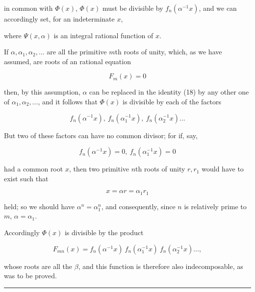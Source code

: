 in common with $\Phi(x)$, $\Phi(x)$ must be divisible by $f_n(\alpha^{-1}x)$, and we can accordingly set, for an indeterminate $x$,


where $\Psi(x,\alpha)$ is an integral rational function of $x$.

If $\alpha, \alpha_1, \alpha_2, \ldots$ are all the primitive $m$th roots of unity, which, as we have assumed, are roots of an  rational equation

\[
F_m(x) = 0
\]

then, by this assumption, $\alpha$ can be replaced in the identity (18) by any other one of $\alpha_1, \alpha_2, \ldots$, and it follows that $\Phi(x)$ is divisible by each of the factors

\[
f_n(\alpha^{-1}x),\ f_n(\alpha_1^{-1}x),\ f_n(\alpha_2^{-1}x) \ldots
\]

But two of these factors can have no common divisor; for if, say,

\[
f_n(\alpha^{-1}x) = 0,\ f_n(\alpha_1^{-1}x) = 0
\]

had a common root $x$, then two primitive $n$th roots of unity $r, r_1$ would have to exist such that

\[
x = \alpha r = \alpha_1 r_1
\]

held; so we should have $\alpha^n = \alpha_1^n$, and consequently, since $n$ is relatively prime to $m$, $\alpha = \alpha_1$.

Accordingly $\Phi(x)$ is divisible by the product

\[
F_{mn}(x) = f_n(\alpha^{-1}x)\ f_n(\alpha_1^{-1}x)\ f_n(\alpha_2^{-1}x) \ldots,
\]

whose roots are all the $\beta$, and this function is therefore also indecomposable, as was to be proved.

\begin{center}
\rule{4cm}{0.4pt}
\end{center}
